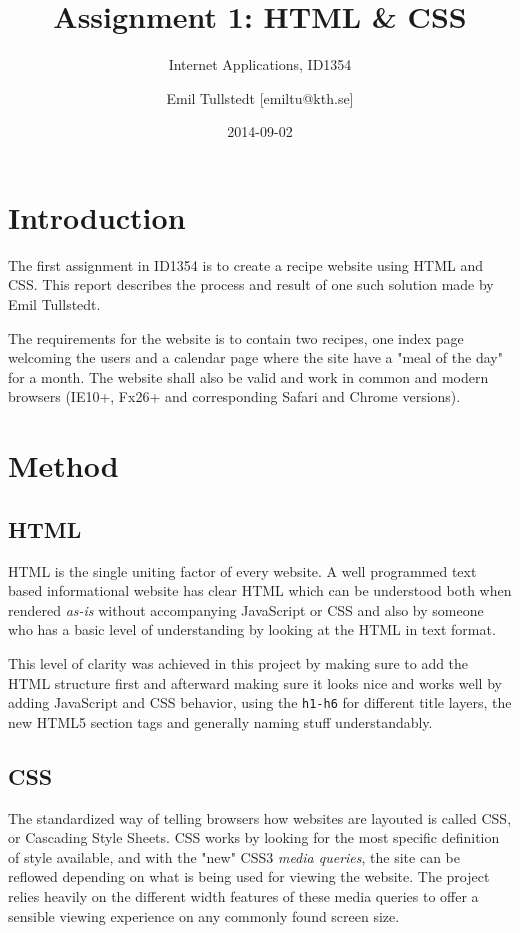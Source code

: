 \documentclass[a4paper]{scrartcl}
\title{Assignment 1: HTML \& CSS}
\subtitle{Internet Applications, ID1354}
\author{Emil Tullstedt [emiltu@kth.se]}
\date{2014-09-02}
\begin{document}
\maketitle

\section{Introduction}

The first assignment in ID1354 is to create a recipe website using HTML and CSS. This report describes the process and result of one such solution made by Emil Tullstedt.

The requirements for the website is to contain two recipes, one index page welcoming the users and a calendar page where the site have a "meal of the day" for a month. The website shall also be valid and work in common and modern browsers (IE10+, Fx26+ and corresponding Safari and Chrome versions).

\section{Method}

\subsection{HTML}

HTML is the single uniting factor of every website. A well programmed text based informational website has clear HTML which can be understood both when rendered \textit{as-is} without accompanying JavaScript or CSS and also by someone who has a basic level of understanding by looking at the HTML in text format.

This level of clarity was achieved in this project by making sure to add the HTML structure first and afterward making sure it looks nice and works well by adding JavaScript and CSS behavior, using the \texttt{h1-h6} for different title layers, the new HTML5 section tags and generally naming stuff understandably.

\subsection{CSS}

The standardized way of telling browsers how websites are layouted is called CSS, or Cascading Style Sheets. CSS works by looking for the most specific definition of style available, and with the "new" CSS3 \textit{media queries}, the site can be reflowed depending on what is being used for viewing the website. The project relies heavily on the different width features of these media queries to offer a sensible viewing experience on any commonly found screen size.
\end{document}
